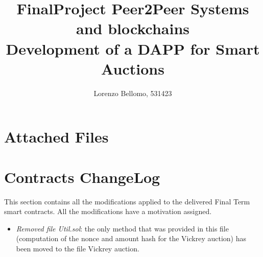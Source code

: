 \documentclass[11pt, a4paper]{report}
\title{
	FinalProject Peer2Peer Systems and blockchains \\
	\large Development of a DAPP for Smart Auctions}
\author{Lorenzo Bellomo, 531423}
\date{}
\begin{document}
	\maketitle
	
\section*{Attached Files}

\section*{Contracts ChangeLog}
This section contains all the modifications applied to the delivered Final Term smart contracts. All the modifications have a motivation assigned.
\begin{itemize}
	\item \emph{Removed file Util.sol}: the only method that was provided in this file (computation of the nonce and amount hash for the Vickrey auction) has been moved to the file Vickrey auction. 
\end{itemize}
	
	
\end{document}

